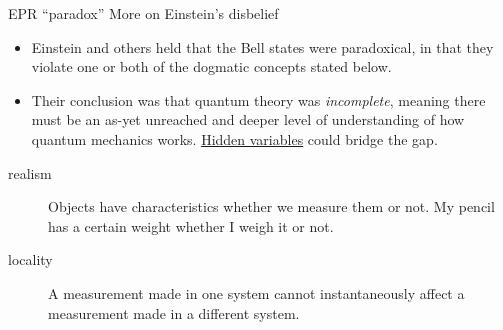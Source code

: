 \begin{frame}{EPR ``paradox'' }{More on Einstein's disbelief}
\begin{itemize}[<+->]
    \item Einstein and others held that the Bell states were paradoxical, in that they violate one or both of the dogmatic concepts stated below.
    \item Their conclusion was that quantum theory was \emph{incomplete}, meaning there must be an as-yet unreached and deeper level of understanding of how quantum mechanics works.  \href{https://en.wikipedia.org/wiki/Hidden-variable_theory}{Hidden variables} could bridge the gap.
\end{itemize}
\begin{description}
  \item[realism]  Objects have characteristics whether we measure them or not.  My pencil has a certain weight whether I weigh it or not.
  \item[locality] A measurement made in one system cannot instantaneously affect a measurement made in a different system.
\end{description}
\end{frame}

